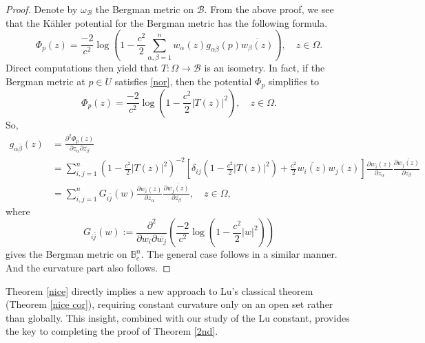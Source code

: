 \documentclass[12pt] {article}
\numberwithin{equation}{section}
\begin{document}
\begin{proof}
Denote by  $\omega_\mathcal B$ the Bergman metric on $\mathcal B$. From the above proof, we see that the K\"{a}hler potential for the Bergman metric has the following formula.
$$
\Phi_{p}( z) =  {\frac{-2}{c^2}} \log      \left (1 - \frac{c^2}{2} \sum_{\alpha, \beta=1}^n  w_\alpha(z)   g_{ \alpha \bar \beta } (p) \overline {w_\beta(z)} \right ), \quad z \in  \Omega.
$$
Direct computations then yield that $T: \Omega \to \mathcal B$ is an isometry. In fact, if the Bergman metric at $p \in U$ 
  satisfies \eqref{nor}, then the potential
$\Phi_{p}$ simplifies to
$$
\Phi_{p}( z) =  {\frac{-2}{c^2}} \log      \left (1 - \frac{c^2}{2} |T(z)|^2 \right ), \quad z \in  \Omega.
$$
So,
 \begin{align*}
g_{\alpha \bar \beta} (z)  &= \frac{\partial^2 \Phi_{p}( z) }{\partial z_\alpha \partial \overline {z_\beta} }\\
&=\sum_{i, j =1}^n  \left (1 - \frac{c^2}{2} |T(z)|^2 \right )^{-2}   \left[    \delta_{i j}  \left (1 - \frac{c^2}{2} |T(z)|^2 \right )     + \frac{c^2}{2}      \overline{w_i(z)}    w_j(z)    \right] {\frac{\partial w_i(z)}  {\partial {z_\alpha}} }  \frac{\partial  \overline{w_j (z)} }{   \partial  {\overline {z_\beta}} } \\
&= \sum_{i, j =1}^n    G_{i \bar j} (w)  {\frac{\partial w_i(z)}  {\partial {z_\alpha}} }  \frac{\partial  \overline{w_j(z)} }{   \partial  {\overline {z_\beta}} }, \quad z\in \Omega,
\end{align*}
where
$$
G_{i \bar j} (w) :=   \frac{\partial^2 }{\partial w_i \partial \overline {w_j} } \left(  \frac{-2}{c^2} \log (1 - \frac{c^2}{2} |w|^2) \right)
$$
gives  the Bergman metric  on $ \mathbb B_c^n$. The general case follows in a similar manner.   And the curvature part also follows.

 

\end{proof}

 


 \medskip




Theorem \ref{nice} directly implies a new approach to Lu's classical theorem (Theorem \ref{nice cor}), requiring constant curvature only on an open set rather than globally. This insight, combined with our study of the Lu constant, provides the key to completing the proof of Theorem \ref{2nd}.


 
 \medskip
\end{document}
